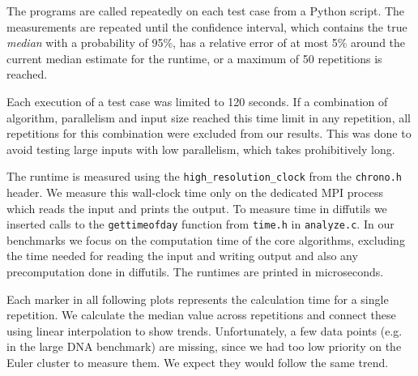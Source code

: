
The programs are called repeatedly on each test case from a Python script. The measurements are repeated until the confidence interval, which contains the true \emph{median} with a probability of 95\%, has a relative error of at most 5\% around the current median estimate for the runtime, or a maximum of 50 repetitions is reached.

Each execution of a test case was limited to 120 seconds. If a combination of algorithm, parallelism and input size reached this time limit in any repetition, all repetitions for this combination were excluded from our results. This was done to avoid testing large inputs with low parallelism, which takes prohibitively long.

The runtime is measured using the \texttt{high\_\linebreak[0]resolution\linebreak[0]\_clock} from the \texttt{chrono.h} header. We measure this wall-clock time only on the dedicated MPI process which reads the input and prints the output. To measure time in diffutils we inserted calls to the \texttt{gettimeofday} function from \texttt{time.h} in \texttt{analyze.c}. In our benchmarks we focus on the computation time of the core algorithms, excluding the time needed for reading the input and writing output and also any precomputation done in diffutils. The runtimes are printed in microseconds.

Each marker in all following plots represents the calculation time for a single repetition. We calculate the median value across repetitions and connect these using linear interpolation to show trends. Unfortunately, a few data points (e.g. in the large DNA benchmark) are missing, since we had too low priority on the Euler cluster to measure them. We expect they would follow the same trend.

